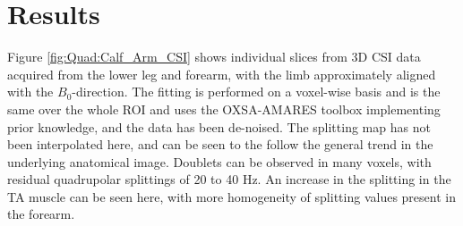 
\section{Results}

Figure \ref{fig:Quad:Calf_Arm_CSI} shows individual slices from 3D \ac{CSI} data acquired from the lower leg and forearm, with the limb approximately aligned with the $B_0$-direction. The fitting is performed on a voxel-wise basis and is the same over the whole \ac{ROI} and uses the OXSA-AMARES toolbox \cite{Purvis2017OXSA:MATLAB} implementing prior knowledge, and the data has been de-noised. The splitting map has not been interpolated here, and can be seen to the follow the general trend in the underlying anatomical image. Doublets can be observed in many voxels, with residual quadrupolar splittings of 20 to 40 Hz. An increase in the splitting in the \ac{TA} muscle can be seen here, with more homogeneity of splitting values present in the forearm.

